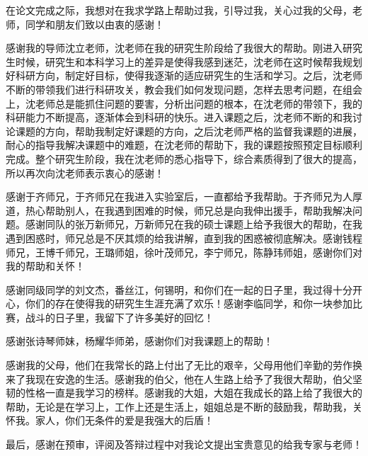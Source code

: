 ﻿

\begin{ack}
在论文完成之际，我想对在我求学路上帮助过我，引导过我，关心过我的父母，老师，同学和朋友们致以由衷的感谢！ 

感谢我的导师沈立老师，沈老师在我的研究生阶段给了我很大的帮助。刚进入研究生时候，研究生和本科学习上的差异是使得我感到迷茫，沈老师在这时候帮我规划好科研方向，制定好目标，使得我逐渐的适应研究生的生活和学习。之后，沈老师不断的带领我们进行科研攻关，教会我们如何发现问题，怎样去思考问题，在组会上，沈老师总是能抓住问题的要害，分析出问题的根本，在沈老师的带领下，我的科研能力不断提高，逐渐体会到科研的快乐。进入课题之后，沈老师不断的和我讨论课题的方向，帮助我制定好课题的方向，之后沈老师严格的监督我课题的进展，耐心的指导我解决课题中的难题，在沈老师的帮助下，我的课题按照预定目标顺利完成。整个研究生阶段，我在沈老师的悉心指导下，综合素质得到了很大的提高，所以再次向沈老师表示衷心的感谢！

感谢于齐师兄，于齐师兄在我进入实验室后，一直都给予我帮助。于齐师兄为人厚道，热心帮助别人，在我遇到困难的时候，师兄总是向我伸出援手，帮助我解决问题。感谢同队的张万新师兄，万新师兄在我的硕士课题上给予我很大的帮助，在我遇到困惑时，师兄总是不厌其烦的给我讲解，直到我的困惑被彻底解决。感谢钱程师兄，王博千师兄，王璐师姐，徐叶茂师兄，李宁师兄，陈静玮师姐，感谢你们对我的帮助和关怀！

感谢同级同学的刘文杰，番丝江，何锡明，和你们在一起的日子里，我过得十分开心，你们的存在使得我的研究生生涯充满了欢乐！感谢李临同学，和你一块参加比赛，战斗的日子里，我留下了许多美好的回忆！

感谢张诗琴师妹，杨耀华师弟，感谢你们对我课题上的帮助！

感谢我的父母，他们在我常长的路上付出了无比的艰辛，父母用他们辛勤的劳作换来了我现在安逸的生活。感谢我的伯父，他在人生路上给予了我很大帮助，伯父坚韧的性格一直是我学习的榜样。感谢我的大姐，大姐在我成长的路上给了我很大的帮助，无论是在学习上，工作上还是生活上，姐姐总是不断的鼓励我，帮助我，关怀我。家人，你们无条件的爱是我强大的后盾！

最后，感谢在预审，评阅及答辩过程中对我论文提出宝贵意见的给我专家与老师！
\end{ack}
